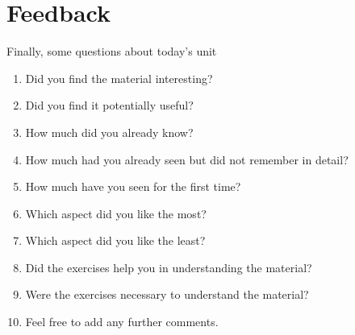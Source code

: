 \documentclass[twoside,a4paper]{article}
\begin{document}
\section{Feedback}


\begin{exercise}[5]
  Finally, some questions about today's unit
  \begin{enumerate}
  \item Did you find the material interesting?
  \item Did you find it potentially useful?
  \item How much did you already know?
  \item How much had you already seen but did not remember in detail?
  \item How much have you seen for the first time?
  \item Which aspect did you like the most?
  \item Which aspect did you like the least?
  \item Did the exercises help you in understanding the material?
  \item Were the exercises necessary to understand the material?
  \item Feel free to add any further comments.
  \end{enumerate}
\end{exercise}
\end{document}

